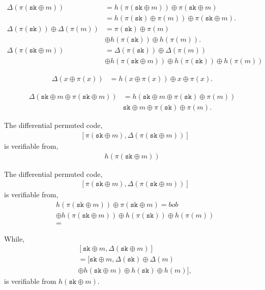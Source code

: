 \documentclass[twocolumn, aps, amsmath, amssymb, nofootinbib, superscriptaddress, longbibliography, doublefloatfix, table-of-contents, eqsecnum, rmp]{revtex4-2}
\begin{document}
\begin{align}
	\Delta(\pi(\mathtt{sk} \oplus m)) &= h(\pi(\mathtt{sk} \oplus m)) \oplus \pi(\mathtt{sk} \oplus m) \nonumber\\
	&= h(\pi(\mathtt{sk}) \oplus \pi(m)) \oplus \pi(\mathtt{sk} \oplus m). \nonumber\\
	\Delta(\pi(\mathtt{sk})) \oplus \Delta(\pi(m)) &= \pi(\mathtt{sk}) \oplus \pi(m) \nonumber\\
	&\oplus h(\pi(\mathtt{sk})) \oplus h(\pi(m)).\nonumber\\
	\Delta(\pi(\mathtt{sk} \oplus m)) &= \Delta(\pi(\mathtt{sk})) \oplus \Delta(\pi(m)) \nonumber\\
	&\oplus h(\pi(\mathtt{sk} \oplus m))
 \oplus h(\pi(\mathtt{sk})) \oplus h(\pi(m))
\end{align}

\begin{align}
	\Delta(x\oplus\pi(x)) &= h(x\oplus \pi(x)) \oplus x \oplus \pi(x).
\end{align}

\begin{align}
	\Delta(\mathtt{sk} \oplus m \oplus \pi(\mathtt{sk}\oplus m)) &= h(\mathtt{sk} \oplus m \oplus \pi(\mathtt{sk}) \oplus \pi(m)) \nonumber\\
	&\mathtt{sk} \oplus m \oplus \pi(\mathtt{sk}) \oplus \pi(m).
\end{align}

The differential permuted code,
\begin{align}
	&[\pi(\mathtt{sk} \oplus m), \Delta(\pi(\mathtt{sk} \oplus m))]
\end{align}
is verifiable from,
\begin{align}
	h(\pi(\mathtt{sk} \oplus m))
\end{align}

The differential permuted code,
\begin{align}
	&[\pi(\mathtt{sk} \oplus m), \Delta(\pi(\mathtt{sk} \oplus m))]
\end{align}
is verifiable from,
\begin{align}
	&h(\pi(\mathtt{sk} \oplus m)) \oplus \pi(\mathtt{sk} \oplus m) = bob \nonumber\\
	&\oplus h(\pi(\mathtt{sk} \oplus m)) \oplus h(\pi(\mathtt{sk})) \oplus h(\pi(m)) \nonumber\\
	&= 
\end{align} 

While,
\begin{align}
	&[\mathtt{sk} \oplus m, \Delta(\mathtt{sk} \oplus m)] \nonumber\\
	&= [\mathtt{sk} \oplus m, \Delta(\mathtt{sk}) \oplus \Delta(m) \nonumber\\
	&\oplus h(\mathtt{sk} \oplus m) \oplus h(\mathtt{sk}) \oplus h(m)],
\end{align}
is verifiable from $h(\mathtt{sk} \oplus m)$.
\end{document}
